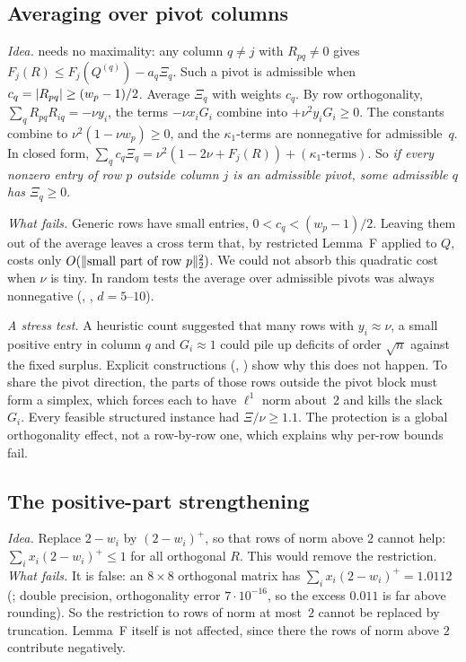 \documentclass[11pt,a4paper]{article}
\begin{document}
\subsection{Averaging over pivot columns}
\emph{Idea.}  needs no maximality: any column $q\ne j$ with $R_{pq}\ne0$ gives $F_j(R)\le F_j(Q^{(q)})-a_q\Xi_q$. Such a pivot is admissible when $c_q=\lvert R_{pq}\rvert\ge(w_p-1)/2$. Average $\Xi_q$ with weights $c_q$. By row orthogonality, $\sum_qR_{pq}R_{iq}=-\nu y_i$, the terms $-\nu x_iG_i$ combine into $+\nu^2y_iG_i\ge0$. The constants combine to $\nu^2(1-\nu w_p)\ge0$, and the $\kappa_1$-terms are nonnegative for admissible~$q$. In closed form, $\sum_qc_q\Xi_q=\nu^2(1-2\nu+F_j(R))+(\kappa_1\text{-terms})$. So \emph{if every nonzero entry of row $p$ outside column $j$ is an admissible pivot, some admissible $q$ has $\Xi_q\ge0$}.

\emph{What fails.} Generic rows have small entries, $0<c_q<(w_p-1)/2$. Leaving them out of the average leaves a cross term that, by restricted Lemma~F applied to $Q$, costs only $O(\lVert \text{small part of row }p\rVert_2^2)$. We could not absorb this quadratic cost when $\nu$ is tiny. In random tests the average over admissible pivots was always nonnegative (, , $d=5$--$10$).

\emph{A stress test.} A heuristic count suggested that many rows with $y_i\approx\nu$, a small positive entry in column $q$ and $G_i\approx1$ could pile up deficits of order $\sqrt n$ against the fixed surplus. Explicit constructions (, ) show why this does not happen. To share the pivot direction, the parts of those rows outside the pivot block must form a simplex, which forces each to have $\ell^1$ norm about~$2$ and kills the slack $G_i$. Every feasible structured instance had $\Xi/\nu\ge1.1$. The protection is a global orthogonality effect, not a row-by-row one, which explains why per-row bounds fail.

\subsection{The positive-part strengthening}
\emph{Idea.} Replace $2-w_i$ by $(2-w_i)^+$, so that rows of norm above $2$ cannot help: $\sum_ix_i(2-w_i)^+\le1$ for all orthogonal $R$. This would remove the restriction. \emph{What fails.} It is false: an $8\times8$ orthogonal matrix has $\sum_ix_i(2-w_i)^+=1.0112$ (; double precision, orthogonality error $7\cdot10^{-16}$, so the excess $0.011$ is far above rounding). So the restriction to rows of norm at most~$2$ cannot be replaced by truncation. Lemma~F itself is not affected, since there the rows of norm above $2$ contribute negatively.
\end{document}
